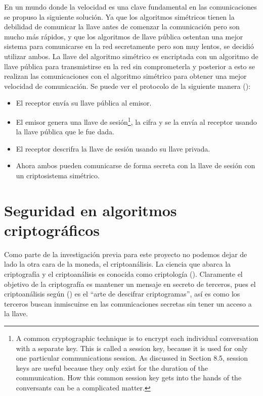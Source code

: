 En un mundo donde la velocidad es una clave fundamental en las comunicaciones se propuso la siguiente solución. Ya que los algoritmos simétricos tienen la debilidad de comunicar la llave antes de comenzar la comunicación pero son mucho más rápidos, y que los algoritmos de llave pública ostentan una mejor sistema para comunicarse en la red secretamente pero son muy lentos, se decidió utilizar ambos. La llave del algoritmo simétrico es encriptada con un algoritmo de llave pública para transmistirse en la red sin comprometerla y posterior a esto se realizan las comunicaciones con el algoritmo simétrico para obtener una mejor velocidad de comunicación. Se puede ver el protocolo de la siguiente manera (\cite{bruce}):
\begin{itemize}
\item El receptor envía su llave pública al emisor.
\item El emisor genera una llave de sesión\footnote{A common cryptographic technique is to encrypt each individual conversation with a separate key. This is called a session key, because it is used for only one
particular communications session. As discussed in Section 8.5, session keys
are useful because they only exist for the duration of the communication. How
this common session key gets into the hands of the conversants can be a
complicated matter.}, la cifra y se la envía al receptor usando la llave pública que le fue dada.
\item El receptor descrifra la llave de sesión usando su llave privada.
\item Ahora ambos pueden comunicarse de forma secreta con la llave de sesión con un criptosistema simétrico.
\end{itemize}





\section{Seguridad en algoritmos criptográficos}
Como parte de la investigación previa para este proyecto no podemos dejar de lado la otra cara de la moneda, el criptoanálisis. La ciencia que abarca la criptografía y el criptoanálisis es conocida como criptología (\cite{denning}). Claramente el objetivo de la criptografía es mantener un mensaje en secreto de terceros, pues el criptoanálisis según (\cite{raeAnalisis}) es el ``arte de descifrar criptogramas'', así es como los terceros buscan inmiscuirse en las comunicaciones secretas sin tener un acceso a la llave.  

